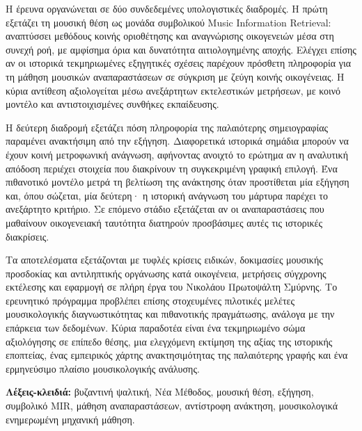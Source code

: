\documentclass[11pt,a4paper]{article}
\begin{document}
Η έρευνα οργανώνεται σε δύο συνδεδεμένες υπολογιστικές διαδρομές. Η πρώτη εξετάζει τη μουσική θέση ως μονάδα συμβολικού Music Information Retrieval: αναπτύσσει μεθόδους κοινής οριοθέτησης και αναγνώρισης οικογενειών μέσα στη συνεχή ροή, με αμφίσημα όρια και δυνατότητα αιτιολογημένης αποχής. Ελέγχει επίσης αν οι ιστορικά τεκμηριωμένες εξηγητικές σχέσεις παρέχουν πρόσθετη πληροφορία για τη μάθηση μουσικών αναπαραστάσεων σε σύγκριση με ζεύγη κοινής οικογένειας. Η κύρια αντίθεση αξιολογείται μέσω ανεξάρτητων εκτελεστικών μετρήσεων, με κοινό μοντέλο και αντιστοιχισμένες συνθήκες εκπαίδευσης.

Η δεύτερη διαδρομή εξετάζει πόση πληροφορία της παλαιότερης σημειογραφίας παραμένει ανακτήσιμη από την εξήγηση. Διαφορετικά ιστορικά σημάδια μπορούν να έχουν κοινή μετροφωνική ανάγνωση, αφήνοντας ανοιχτό το ερώτημα αν η αναλυτική απόδοση περιέχει στοιχεία που διακρίνουν τη συγκεκριμένη γραφική επιλογή. Ένα πιθανοτικό μοντέλο μετρά τη βελτίωση της ανάκτησης όταν προστίθεται μία εξήγηση και, όπου σώζεται, μία δεύτερη· η ιστορική ανάγνωση του μάρτυρα παρέχει το ανεξάρτητο κριτήριο. Σε επόμενο στάδιο εξετάζεται αν οι αναπαραστάσεις που μαθαίνουν οικογενειακή ταυτότητα διατηρούν προσβάσιμες αυτές τις ιστορικές διακρίσεις.

Τα αποτελέσματα εξετάζονται με τυφλές κρίσεις ειδικών, δοκιμασίες μουσικής προσδοκίας και αντιληπτικής οργάνωσης κατά οικογένεια, μετρήσεις σύγχρονης εκτέλεσης και εφαρμογή σε πλήρη έργα του Νικολάου Πρωτοψάλτη Σμύρνης. Το ερευνητικό πρόγραμμα προβλέπει επίσης στοχευμένες πιλοτικές μελέτες μουσικολογικής διαγνωστικότητας και πιθανοτικής πραγμάτωσης, ανάλογα με την επάρκεια των δεδομένων. Κύρια παραδοτέα είναι ένα τεκμηριωμένο σώμα αξιολόγησης σε επίπεδο θέσης, μια ελεγχόμενη εκτίμηση της αξίας της ιστορικής εποπτείας, ένας εμπειρικός χάρτης ανακτησιμότητας της παλαιότερης γραφής και ένα ερμηνεύσιμο πλαίσιο μουσικολογικής ανάλυσης.

\noindent\textbf{Λέξεις-κλειδιά:} βυζαντινή ψαλτική, Νέα Μέθοδος, μουσική θέση, εξήγηση, συμβολικό MIR, μάθηση αναπαραστάσεων, αντίστροφη ανάκτηση, μουσικολογικά ενημερωμένη μηχανική μάθηση.
\end{document}

